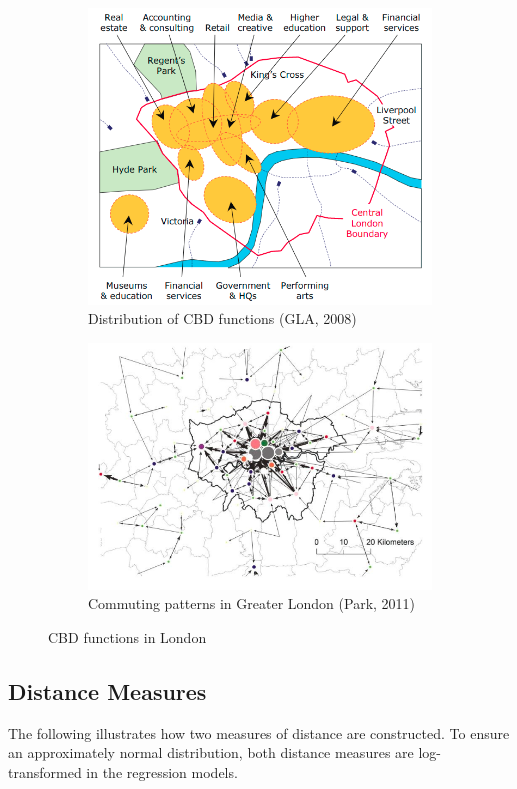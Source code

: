 \documentclass{article}
\begin{document}
\begin{figure}[H]
\begin{subfigure}{.5\textwidth}
  \centering
  \includegraphics[width=.9\linewidth]{images/cbd.png}
\caption{Distribution of CBD functions (GLA, 2008)}
  \label{fig:cbd}
\end{subfigure}%
\begin{subfigure}{.5\textwidth}
  \centering
  \includegraphics[width=.9\linewidth]{images/park2011.png}
  \caption{Commuting patterns in Greater London (Park, 2011)}
  \label{fig:park2011}
\end{subfigure}
\caption{CBD functions in London}
\label{fig:2}
\end{figure}


\subsection{Distance Measures}
The following illustrates how two measures of distance are constructed. To ensure an approximately normal distribution, both distance measures are log-transformed in the regression models.
\end{document}
